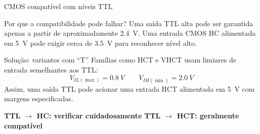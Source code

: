 \begin{frame}{CMOS compatível com níveis TTL}
    \begin{block}{Por que a compatibilidade pode falhar?}
        Uma saída TTL alta pode ser garantida apenas a partir de aproximadamente
        2.4~V. Uma entrada CMOS HC alimentada em 5~V pode
        exigir cerca de 3.5~V para reconhecer nível alto.
    \end{block}

    \begin{alertblock}{Solução: variantes com ``T''}
        Famílias como HCT e VHCT usam limiares de entrada semelhantes aos TTL:
        \[
            V_{IL(\max)}=0.8~V
            \qquad
            V_{IH(\min)}=2.0~V
        \]
        Assim, uma saída TTL pode acionar uma entrada HCT alimentada em
        5~V com margens especificadas.
    \end{alertblock}

    \centering
    \textbf{TTL $\rightarrow$ HC: verificar cuidadosamente}\qquad
    \textbf{TTL $\rightarrow$ HCT: geralmente compatível}
\end{frame}
